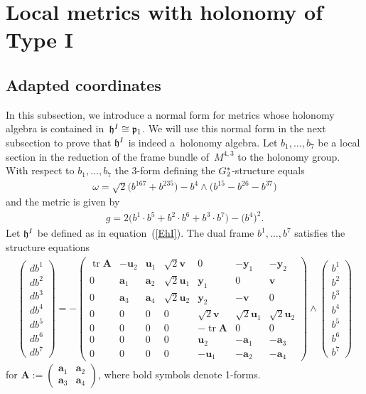 \documentclass[11pt]{article}
\numberwithin{equation}{section}
\newcommand\fh{{\frak h}}
\newcommand\fp{{\frak p}}
\newcommand\ba{{\mathbf a}}
\newcommand\bA{{\mathbf A}}
\newcommand\bu{{\mathbf u}}
\newcommand\by{{\mathbf y}}
\newcommand\bv{{\mathbf v}}
\newcommand{\G}{\mathop{{{\rm G}_{2}^*}}}
\newcommand{\tr}{\operatorname{tr}}
\begin{document}
\section{Local metrics with holonomy of Type I} \label{S2}
\subsection{Adapted coordinates}
In this subsection, we introduce a normal form for metrics whose holonomy algebra is contained in~$\fh^I\cong\fp_1$. We will use this normal form in the next subsection to prove that $\fh^I$ is indeed a~holonomy algebra. Let $b_1,\dots,b_7$ be a local section in the reduction of the frame bundle of~$M^{4,3}$ to the holonomy group. With respect to $b_1,\dots,b_7$ the 3-form defining the $\G$-structure equals
\begin{gather*}
\omega=\sqrt 2\big(b^{167}+b^{235}\big)-b^4\wedge \big(b^{15}-b^{26}-b^{37}\big)
\end{gather*}
and the metric is given by
\begin{gather}
g=2\big(b^1\cdot b^5+b^2\cdot b^6+b^3\cdot b^7\big)- \big(b^4\big)^2. \label{Eip}
\end{gather}
Let $\fh^I$ be defined as in equation~(\ref{EhI}). The dual frame $b^1,\dots,b^7$ satisfies the structure equations
\begin{gather}\label{Ese}
\left(\begin{matrix} db^1\\db^2\\db^3\\db^4\\db^5\\db^6\\db^7\end{matrix}\right) = -\left(
\begin{matrix}
\tr \bA &-\bu_2&\bu_1&\sqrt 2 \bv&0&-\by_1&-\by_2\\
0&\ba_1&\ba_2&\sqrt 2 \bu_1&\by_1&0&\bv\\
0&\ba_3&\ba_4&\sqrt 2 \bu_2&\by_2&-\bv&0\\
0&0&0&0&\sqrt 2 \bv&\sqrt 2 \bu_1&\sqrt 2 \bu_2\\
0&0&0&0&-\tr \bA&0&0\\
0&0&0&0&\bu_2&-\ba_1&-\ba_3\\
0&0&0&0&-\bu_1&-\ba_2&-\ba_4
	\end{matrix}\right) \wedge \left(\begin{matrix} b^1\\b^2\\b^3\\b^4\\b^5\\b^6\\b^7\end{matrix}\right)
\end{gather}	
for	$ \bA:=\left(\begin{smallmatrix} \ba_1&\ba_2\\ \ba_3&\ba_4\end{smallmatrix}\right)$, where bold symbols denote 1-forms.
\end{document}
